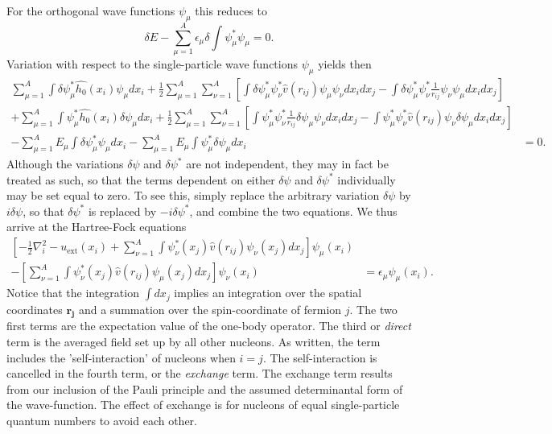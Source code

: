 For the orthogonal wave functions $\psi_{\mu}$ this reduces to
\[
  \delta E - \sum_{{\mu}=1}^A \epsilon_{\mu} \delta \int \psi_{\mu}^*
  \psi_{\mu} = 0.
\]
Variation with respect to the single-particle wave functions
$\psi_{\mu}$ yields then
\begin{equation*}
\begin{split}
  \sum_{\mu=1}^A \int \delta\psi_{\mu}^*\hat{h_0}(x_i)\psi_{\mu} dx_i
  + \frac{1}{2}\sum_{{\mu}=1}^A\sum_{{\nu}=1}^A \left[ \int
    \delta\psi_{\mu}^*\psi_{\nu}^*\hat{v}(r_{ij})\psi_{\mu}\psi_{\nu}
    dx_idx_j- \int
    \delta\psi_{\mu}^*\psi_{\nu}^*\frac{1}{r_{ij}}\psi_{\nu}\psi_{\mu}
    dx_idx_j \right] & \\ + \sum_{\mu=1}^A \int
  \psi_{\mu}^*\hat{h_0}(x_i)\delta\psi_{\mu} dx_i +
  \frac{1}{2}\sum_{{\mu}=1}^A\sum_{{\nu}=1}^A \left[ \int
    \psi_{\mu}^*\psi_{\nu}^*\frac{1}
        {r_{ij}}\delta\psi_{\mu}\psi_{\nu} dx_idx_j- \int
        \psi_{\mu}^*\psi_{\nu}^*\hat{v}(r_{ij})\psi_{\nu}\delta\psi_{\mu}
        dx_idx_j \right] & \\ - \sum_{{\mu}=1}^A E_{\mu} \int
  \delta\psi_{\mu}^* \psi_{\mu}dx_i - \sum_{{\mu}=1}^A E_{\mu} \int
  \psi_{\mu}^* \delta\psi_{\mu}dx_i & = 0.
\end{split}
\end{equation*}
Although the variations $\delta\psi$ and $\delta\psi^*$ are not
independent, they may in fact be treated as such, so that the terms
dependent on either $\delta\psi$ and $\delta\psi^*$ individually may
be set equal to zero. To see this, simply replace the arbitrary
variation $\delta\psi$ by $i\delta\psi$, so that $\delta\psi^*$ is
replaced by $-i\delta\psi^*$, and combine the two equations. We thus
arrive at the Hartree-Fock equations
\[
  \begin{split}
    \left[ -\frac{1}{2}\nabla_i^2-u_{\mathrm{ext}}(x_i) +
      \sum_{{\nu}=1}^A \int \psi_{\nu}^*(x_j)\hat{v}(r_{ij})
      \psi_{\nu}(x_j)dx_j \right] \psi_{\mu}(x_i) & \\ - \left[
      \sum_{{\nu}=1}^A \int \psi_{\nu}^*(x_j)
      \hat{v}(r_{ij})\psi_{\mu}(x_j) dx_j \right] \psi_{\nu}(x_i) & =
    \epsilon_{\mu} \psi_{\mu}(x_i).
  \end{split}
\]
Notice that the integration $\int dx_j$ implies an integration over
the spatial coordinates $\mathbf{r_j}$ and a summation over the
spin-coordinate of fermion $j$.  The two first terms are the
expectation value of the one-body operator. The third or \emph{direct}
term is the averaged field set up by all other nucleons.  As written,
the term includes the 'self-interaction' of nucleons when $i=j$. The
self-interaction is cancelled in the fourth term, or the
\emph{exchange} term. The exchange term results from our inclusion of
the Pauli principle and the assumed determinantal form of the
wave-function. The effect of exchange is for nucleons of equal
single-particle quantum numbers to avoid each other.

